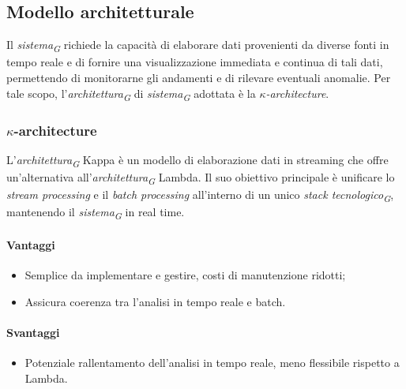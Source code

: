 \subsection{Modello architetturale}
Il \textit{sistema}\textsubscript{\textit{G}} richiede la capacità di elaborare dati provenienti da diverse fonti in tempo reale e di fornire una visualizzazione immediata e continua di tali dati, permettendo di monitorarne gli andamenti e di rilevare eventuali anomalie. 
Per tale scopo, l'\textit{architettura}\textsubscript{\textit{G}} di \textit{sistema}\textsubscript{\textit{G}} adottata è la \textit{$\kappa$-architecture}.

\subsubsection{$\kappa$-architecture}
L'\textit{architettura}\textsubscript{\textit{G}} Kappa è un modello di elaborazione dati in streaming che offre un'alternativa all'\textit{architettura}\textsubscript{\textit{G}} Lambda. Il suo obiettivo principale è unificare lo \textit{stream processing} e il \textit{batch processing} all'interno di un unico \textit{stack tecnologico}\textsubscript{\textit{G}}, mantenendo il \textit{sistema}\textsubscript{\textit{G}} in real time.

\paragraph{Vantaggi}
\begin{itemize}
    \item Semplice da implementare e gestire, costi di manutenzione ridotti;
    \item Assicura coerenza tra l'analisi in tempo reale e batch.
\end{itemize}

\paragraph{Svantaggi}
\begin{itemize}
    \item Potenziale rallentamento dell'analisi in tempo reale, meno flessibile rispetto a Lambda.
\end{itemize}

